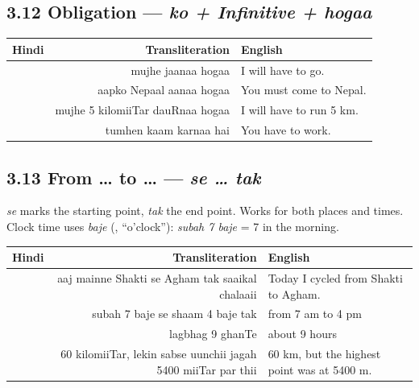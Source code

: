 \subsection{3.12 Obligation — \textit{ko + Infinitive + hogaa}}


\begin{tabular}{@{}HRG@{}}
  \toprule
  Hindi & Transliteration & English \\
  \midrule
                     & mujhe jaanaa hogaa                  & I will have to go. \\
                & aapko Nepaal aanaa hogaa            & You must come to Nepal. \\
        & mujhe 5 kilomiiTar dauRnaa hogaa            & I will have to run 5 km. \\
                 & tumhen kaam karnaa hai              & You have to work. \\
  \bottomrule
\end{tabular}

\subsection{3.13 From \ldots{} to \ldots{} — \textit{se \ldots{} tak}}


\textit{se} marks the starting point, \textit{tak} the end point. Works for both places and times.
Clock time uses \textit{baje} (, ``o'clock''): \textit{subah 7 baje} = 7 in the morning.

\begin{tabular}{@{}HRG@{}}
  \toprule
  Hindi & Transliteration & English \\
  \midrule
   & aaj mainne Shakti se Agham tak saaikal chalaaii & Today I cycled from Shakti to Agham. \\
              & subah 7 baje se shaam 4 baje tak               & from 7 am to 4 pm \\
                              & lagbhag 9 ghanTe                               & about 9 hours \\
   & 60 kilomiiTar, lekin sabse uunchii jagah 5400 miiTar par thii & 60 km, but the highest point was at 5400 m. \\
  \bottomrule
\end{tabular}

